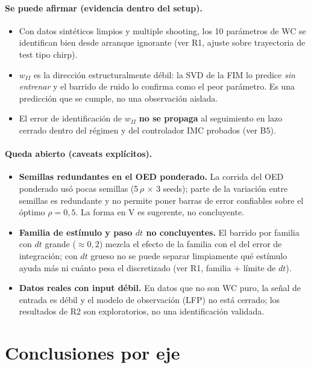 \documentclass[11pt,a4paper]{article}
\begin{document}
\paragraph{Se puede afirmar (evidencia dentro del setup).}
\begin{itemize}[leftmargin=1.4em]
  \item Con datos sintéticos limpios y multiple shooting, los 10 parámetros de WC
  se identifican bien desde arranque ignorante (ver R1, ajuste sobre trayectoria
  de test tipo chirp).
  \item $w_{II}$ es la dirección estructuralmente débil: la SVD de la FIM lo
  predice \emph{sin entrenar} y el barrido de ruido lo confirma como el peor
  parámetro. Es una predicción que se cumple, no una observación aislada.
  \item El error de identificación de $w_{II}$ \textbf{no se propaga} al
  seguimiento en lazo cerrado dentro del régimen y del controlador IMC probados
  (ver B5).
\end{itemize}

\paragraph{Queda abierto (caveats explícitos).}
\begin{itemize}[leftmargin=1.4em]
  \item \textbf{Semillas redundantes en el OED ponderado.} La corrida del OED
  ponderado usó pocas semillas (5\,$\rho$ $\times$ 3 seeds); parte de la variación
  entre semillas es redundante y no permite poner barras de error confiables sobre
  el óptimo $\rho=0{,}5$. La forma en V es sugerente, no concluyente.
  \item \textbf{Familia de estímulo y paso $dt$ no concluyentes.} El barrido por
  familia con $dt$ grande ($\approx0{,}2$) mezcla el efecto de la familia con el
  del error de integración; con $dt$ grueso no se puede separar limpiamente qué
  estímulo ayuda más ni cuánto pesa el discretizado (ver R1, familia + límite de
  $dt$).
  \item \textbf{Datos reales con input débil.} En datos que no son WC puro, la
  señal de entrada es débil y el modelo de observación (LFP) no está cerrado; los
  resultados de R2 son exploratorios, no una identificación validada.
\end{itemize}

\section{Conclusiones por eje}
\end{document}
